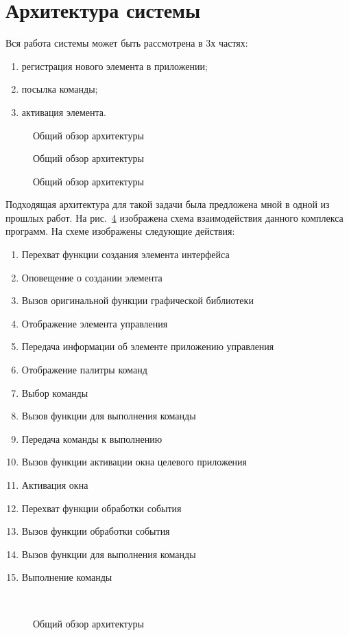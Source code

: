 \section{Архитектура системы}

Вся работа системы может быть рассмотрена в 3х частях:
\begin{enumerate}
    \item регистрация нового элемента в приложении;
    \item посылка команды;
    \item активация элемента.
\end{enumerate}

\begin{figure}
	\centering
	
	\caption{Общий обзор архитектуры}\label{fig:arch}
\end{figure}

\begin{figure}
	\centering
	
	\caption{Общий обзор архитектуры}\label{fig:arch}
\end{figure}

\begin{figure}
	\centering
	
	\caption{Общий обзор архитектуры}\label{fig:arch}
\end{figure}

Подходящая архитектура для такой задачи была предложена мной в одной из прошлых
работ\cite{polshakovinject}. На рис.~\ref{fig:arch} изображена схема
взаимодействия данного комплекса программ. На схеме изображены следующие
действия:
\begin{enumerate}
    \item Перехват функции создания элемента интерфейса
    \item Оповещение о создании элемента
    \item Вызов оригинальной функции графической библиотеки
    \item Отображение элемента управления
    \item Передача информации об элементе приложению управления
    \item Отображение палитры команд
    \item Выбор команды
    \item Вызов функции для выполнения команды
    \item Передача команды к выполнению
    \item Вызов функции активации окна целевого приложения
    \item Активация окна
    \item Перехват функции обработки события
    \item Вызов функции обработки события
    \item Вызов функции для выполнения команды
    \item Выполнение команды
\end{enumerate}

\begin{figure}
	\centering
	 \\
	\caption{Общий обзор архитектуры}\label{fig:arch}
\end{figure}
